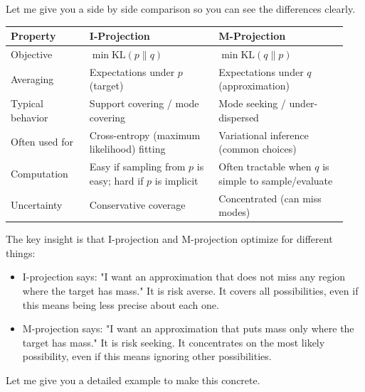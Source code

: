 Let me give you a side by side comparison so you can see the differences clearly.

\vspace{1em}

\begin{center}
{\small
\begin{tabular}{@{}p{0.22\linewidth}p{0.36\linewidth}p{0.36\linewidth}@{}}
\toprule
Property & I-Projection & M-Projection \\
\midrule
Objective & $\min \text{KL}(p \| q)$ & $\min \text{KL}(q \| p)$ \\
Averaging & Expectations under $p$ (target) & Expectations under $q$ (approximation) \\
Typical behavior & Support covering / mode covering & Mode seeking / under-dispersed \\
Often used for & Cross-entropy (maximum likelihood) fitting & Variational inference (common choices) \\
Computation & Easy if sampling from $p$ is easy; hard if $p$ is implicit & Often tractable when $q$ is simple to sample/evaluate \\
Uncertainty & Conservative coverage & Concentrated (can miss modes) \\
\bottomrule
\end{tabular}
}
\end{center}

\vspace{1.5em}

The key insight is that I-projection and M-projection optimize for different things:

\begin{itemize}
\item I-projection says: "I want an approximation that does not miss any region where the target has mass." It is risk averse. It covers all possibilities, even if this means being less precise about each one.

\item M-projection says: "I want an approximation that puts mass only where the target has mass." It is risk seeking. It concentrates on the most likely possibility, even if this means ignoring other possibilities.
\end{itemize}

\vspace{2em}

Let me give you a detailed example to make this concrete.

\vspace{1.5em}


